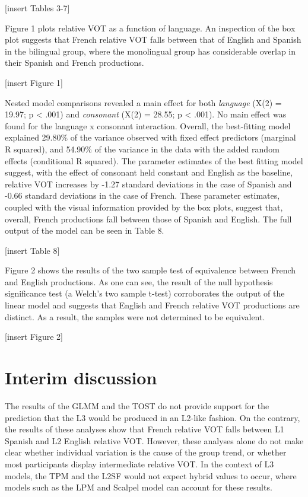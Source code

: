 \documentclass[
  english,
  man]{apa6}
\begin{document}
{[}insert Tables 3-7{]}

Figure 1 plots relative VOT as a function of language.
An inspection of the box plot suggests that French relative VOT falls between that of English and Spanish in the bilingual group, where the monolingual group has considerable overlap in their Spanish and French productions.

{[}insert Figure 1{]}

Nested model comparisons revealed a main effect for both \emph{language} (X(2) = 19.97; p \textless{} .001) and \emph{consonant} (X(2) = 28.55; p \textless{} .001).
No main effect was found for the language x consonant interaction.
Overall, the best-fitting model explained 29.80\% of the variance observed with fixed effect predictors (marginal R squared), and 54.90\% of the variance in the data with the added random effects (conditional R squared).
The parameter estimates of the best fitting model suggest, with the effect of consonant held constant and English as the baseline, relative VOT increases by -1.27 standard deviations in the case of Spanish and -0.66 standard deviations in the case of French.
These parameter estimates, coupled with the visual information provided by the box plots, suggest that, overall, French productions fall between those of Spanish and English.
The full output of the model can be seen in Table 8.

{[}insert Table 8{]}

Figure 2 shows the results of the two sample test of equivalence between French and English productions.
As one can see, the result of the null hypothesis significance test (a Welch's two sample t-test) corroborates the output of the linear model and suggests that English and French relative VOT productions are distinct.
As a result, the samples were not determined to be equivalent.

{[}insert Figure 2{]}

\hypertarget{interim-discussion}{%
\section{Interim discussion}\label{interim-discussion}}

The results of the GLMM and the TOST do not provide support for the prediction that the L3 would be produced in an L2-like fashion.
On the contrary, the results of these analyses show that French relative VOT falls between L1 Spanish and L2 English relative VOT.
However, these analyses alone do not make clear whether individual variation is the cause of the group trend, or whether most participants display intermediate relative VOT.
In the context of L3 models, the TPM and the L2SF would not expect hybrid values to occur, where models such as the LPM and Scalpel model can account for these results.
\end{document}

